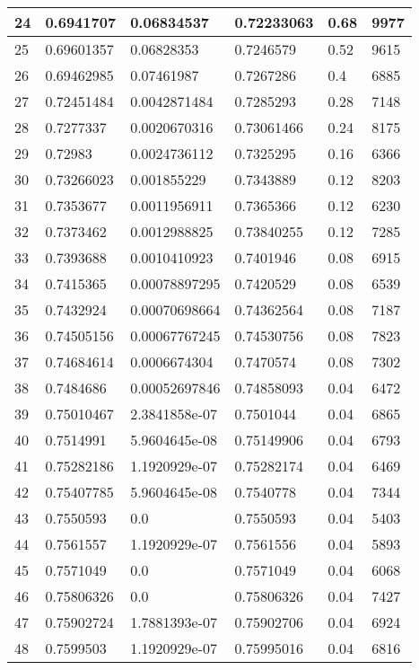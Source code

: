 \begin{longtable}{|l|l|l|l|l|l|}
24 & 0.6941707 & 0.06834537 & 0.72233063 & 0.68 & 9977 \\ \hline 
25 & 0.69601357 & 0.06828353 & 0.7246579 & 0.52 & 9615 \\ \hline 
26 & 0.69462985 & 0.07461987 & 0.7267286 & 0.4 & 6885 \\ \hline 
27 & 0.72451484 & 0.0042871484 & 0.7285293 & 0.28 & 7148 \\ \hline 
28 & 0.7277337 & 0.0020670316 & 0.73061466 & 0.24 & 8175 \\ \hline 
29 & 0.72983 & 0.0024736112 & 0.7325295 & 0.16 & 6366 \\ \hline 
30 & 0.73266023 & 0.001855229 & 0.7343889 & 0.12 & 8203 \\ \hline 
31 & 0.7353677 & 0.0011956911 & 0.7365366 & 0.12 & 6230 \\ \hline 
32 & 0.7373462 & 0.0012988825 & 0.73840255 & 0.12 & 7285 \\ \hline 
33 & 0.7393688 & 0.0010410923 & 0.7401946 & 0.08 & 6915 \\ \hline 
34 & 0.7415365 & 0.00078897295 & 0.7420529 & 0.08 & 6539 \\ \hline 
35 & 0.7432924 & 0.00070698664 & 0.74362564 & 0.08 & 7187 \\ \hline 
36 & 0.74505156 & 0.00067767245 & 0.74530756 & 0.08 & 7823 \\ \hline 
37 & 0.74684614 & 0.0006674304 & 0.7470574 & 0.08 & 7302 \\ \hline 
38 & 0.7484686 & 0.00052697846 & 0.74858093 & 0.04 & 6472 \\ \hline 
39 & 0.75010467 & 2.3841858e-07 & 0.7501044 & 0.04 & 6865 \\ \hline 
40 & 0.7514991 & 5.9604645e-08 & 0.75149906 & 0.04 & 6793 \\ \hline 
41 & 0.75282186 & 1.1920929e-07 & 0.75282174 & 0.04 & 6469 \\ \hline 
42 & 0.75407785 & 5.9604645e-08 & 0.7540778 & 0.04 & 7344 \\ \hline 
43 & 0.7550593 & 0.0 & 0.7550593 & 0.04 & 5403 \\ \hline 
44 & 0.7561557 & 1.1920929e-07 & 0.7561556 & 0.04 & 5893 \\ \hline 
45 & 0.7571049 & 0.0 & 0.7571049 & 0.04 & 6068 \\ \hline 
46 & 0.75806326 & 0.0 & 0.75806326 & 0.04 & 7427 \\ \hline 
47 & 0.75902724 & 1.7881393e-07 & 0.75902706 & 0.04 & 6924 \\ \hline 
48 & 0.7599503 & 1.1920929e-07 & 0.75995016 & 0.04 & 6816 \\ \hline 

\end{longtable}

